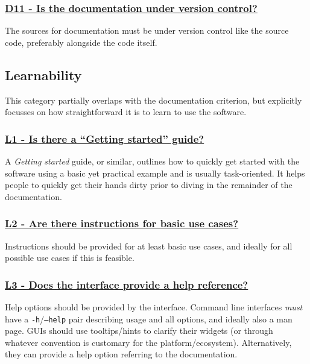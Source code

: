 \documentclass[a4paper,11pt]{article}
\newcommand{\criterion}[2]{\subsubsection*{\underline{#1 - #2}}\label{id:#1}}
\newcommand\CheckTable{%
  \begin{tabular}{ccccc}
    No & Minimal & Adequate & Good & Perfect \\
    0 & 1 & 2 & 3 & 4 \\
    \hline
    $\square$ & $\square$ & $\square$ & $\square$ & $\square$ \\
  \end{tabular}%
}
\begin{document}
\newcommand{\dElevenID}{D11}
\newcommand{\dElevenText}{Is the documentation under version control?}
\criterion{\dElevenID}{\dElevenText}

The sources for documentation must be under version control like the source
code, preferably alongside the code itself.


\subsection{Learnability}\label{sec:lea}

This category partially overlaps with the documentation criterion, but explicitly
focusses on how straightforward it is to learn to use the software.

\newcommand{\lOneID}{L1}
\newcommand{\lOneText}{Is there a ``Getting started'' guide?}
\criterion{\lOneID}{\lOneText}

A \textit{Getting started} guide, or similar, outlines how to quickly get
started with the software using a basic yet practical example and is usually task-oriented.
It helps people to quickly get their hands dirty prior to diving in the
remainder of the documentation. 


\newcommand{\lTwoID}{L2}
\newcommand{\lTwoText}{Are there instructions for basic use cases?}
\criterion{\lTwoID}{\lTwoText}

Instructions should be provided for at least basic use cases, and ideally for
all possible use cases if this is feasible.

%
%
%


\newcommand{\lThreeID}{L3}
\newcommand{\lThreeText}{Does the interface provide a help reference?}
\criterion{\lThreeID}{\lThreeText}

Help options should be provided by the interface. Command line interfaces
\emph{must} have a \texttt{-h}/\texttt{--help} pair describing usage and all
options, and ideally also a man page. GUIs should use tooltips/hints to clarify
their widgets (or through whatever convention is customary for the
platform/ecosystem). Alternatively, they can provide a help option referring to
the documentation.
\end{document}
